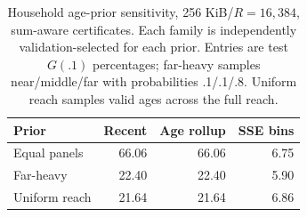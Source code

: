 \begin{table}[t]\centering\small
\caption{Household age-prior sensitivity, 256 KiB/$R=16{,}384$, sum-aware certificates. Each family is independently validation-selected for each prior. Entries are test $G(.1)$ percentages; far-heavy samples near/middle/far with probabilities .1/.1/.8. Uniform reach samples valid ages across the full reach.}\label{tab:ageprior}
\begin{tabular}{@{}lrrr@{}}\toprule
Prior & Recent & Age rollup & SSE bins\\\midrule
Equal panels & 66.06 & 66.06 & 6.75\\
Far-heavy & 22.40 & 22.40 & 5.90\\
Uniform reach & 21.64 & 21.64 & 6.86\\
\bottomrule\end{tabular}\end{table}
